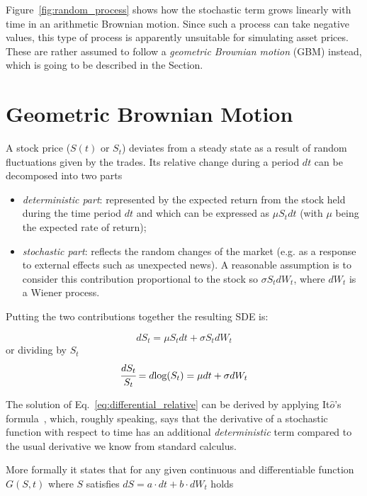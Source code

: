 Figure~\ref{fig:random_process} shows how the stochastic term grows linearly with time in an arithmetic Brownian motion.
Since such a process can take negative values, this type of process is apparently unsuitable for simulating asset prices. These are rather assumed to follow a \emph{geometric Brownian motion} (GBM) instead, which is going to be described in the Section. 

\section{Geometric Brownian Motion}
\label{derivation-of-log-normal-stochastic-differential-equation}

A stock price (\(S(t)\) or $S_t$) deviates from a steady state as a result of random fluctuations given by the trades. 
Its relative change during a period \(dt\) can be decomposed into two parts

\begin{itemize}
\tightlist
\item \emph{deterministic part}: represented by the expected return from the stock held during the time period \(dt\) and which can be expressed as \(\mu S_tdt\) (with $\mu$ being the expected rate of return);
\item \emph{stochastic part}: reflects the random changes of the market (e.g. as a response to external effects such as unexpected news). A reasonable assumption is to consider this contribution proportional to the stock so \(\sigma S_t dW_t\), where \(dW_t\) is a Wiener process.
\end{itemize}
Putting the two contributions together the resulting SDE is:

\begin{equation}
dS_t = \mu S_t dt + \sigma S_t dW_t
\label{eq:differential}
\end{equation}
or dividing by $S_t$
\begin{equation}
\cfrac{dS_t}{S_t} = d\textrm{log}(S_t) = \mu dt + \sigma dW_t
\label{eq:differential_relative}
\end{equation}

The solution of Eq.~\ref{eq:differential_relative} can be derived by applying It\(\hat{o}\)'s formula~\cite{bib:ito_lemma}, which, roughly speaking, says that the derivative of a stochastic function with respect to time has an additional \emph{deterministic} term compared to the usual derivative we know from standard calculus. 

More formally it states that for any given continuous and differentiable function \(G(S, t)\) where \(S\) satisfies \(dS=a\cdot dt +b\cdot dW_t\) holds

